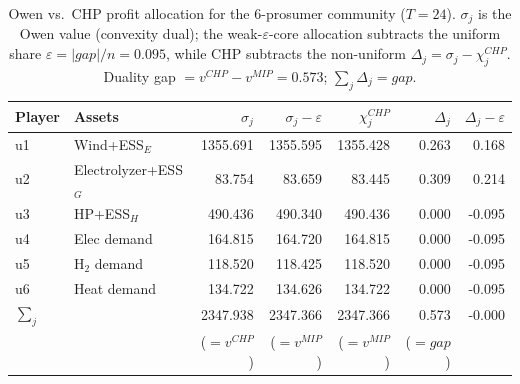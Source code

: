 \begin{table}[t]
\centering
\caption{Owen vs.\ CHP profit allocation for the $6$-prosumer community ($T=24$). $\sigma_j$ is the Owen value (convexity dual); the weak-$\varepsilon$-core allocation subtracts the uniform share $\varepsilon=|gap|/n=0.095$, while CHP subtracts the non-uniform $\Delta_j=\sigma_j-\chi_j^{CHP}$. Duality gap $=v^{CHP}-v^{MIP}=0.573$; $\sum_j\Delta_j=gap$.}
\label{tab:owen_vs_chp}
\begin{tabular}{llrrrrr}
\toprule
Player & Assets & $\sigma_j$ & $\sigma_j-\varepsilon$ & $\chi_j^{CHP}$ & $\Delta_j$ & $\Delta_j-\varepsilon$ \\
\midrule
u1 & Wind+ESS$_E$ & 1355.691 & 1355.595 & 1355.428 & 0.263 & 0.168 \\
u2 & Electrolyzer+ESS$_G$ & 83.754 & 83.659 & 83.445 & 0.309 & 0.214 \\
u3 & HP+ESS$_H$ & 490.436 & 490.340 & 490.436 & 0.000 & -0.095 \\
u4 & Elec demand & 164.815 & 164.720 & 164.815 & 0.000 & -0.095 \\
u5 & H$_2$ demand & 118.520 & 118.425 & 118.520 & 0.000 & -0.095 \\
u6 & Heat demand & 134.722 & 134.626 & 134.722 & 0.000 & -0.095 \\
\midrule
$\sum_j$ & & 2347.938 & 2347.366 & 2347.366 & 0.573 & -0.000 \\
 & & ($=v^{CHP}$) & ($=v^{MIP}$) & ($=v^{MIP}$) & ($=gap$) & \\
\bottomrule
\end{tabular}
\end{table}
